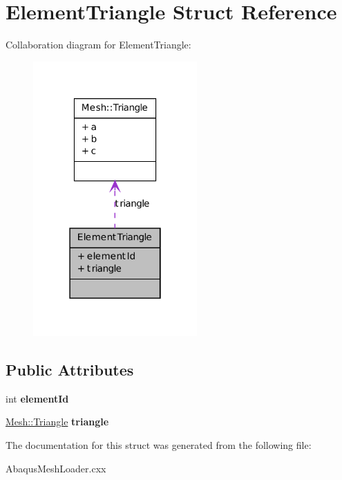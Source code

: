 \hypertarget{struct_element_triangle}{
\section{ElementTriangle Struct Reference}
\label{struct_element_triangle}
}


Collaboration diagram for ElementTriangle:
\nopagebreak
\begin{figure}[H]
\begin{center}
\leavevmode
\includegraphics[width=178pt]{struct_element_triangle__coll__graph}
\end{center}
\end{figure}
\subsection*{Public Attributes}
\begin{DoxyCompactItemize}
\item 
\hypertarget{struct_element_triangle_acc4f1a0318111ca76d5ffccfe65cec3b}{
int {\bfseries elementId}}
\label{struct_element_triangle_acc4f1a0318111ca76d5ffccfe65cec3b}

\item 
\hypertarget{struct_element_triangle_a9fad2045b15d56e7c735da2933e4d18a}{
\hyperlink{struct_mesh_1_1_triangle}{Mesh::Triangle} {\bfseries triangle}}
\label{struct_element_triangle_a9fad2045b15d56e7c735da2933e4d18a}

\end{DoxyCompactItemize}


The documentation for this struct was generated from the following file:\begin{DoxyCompactItemize}
\item 
AbaqusMeshLoader.cxx\end{DoxyCompactItemize}

